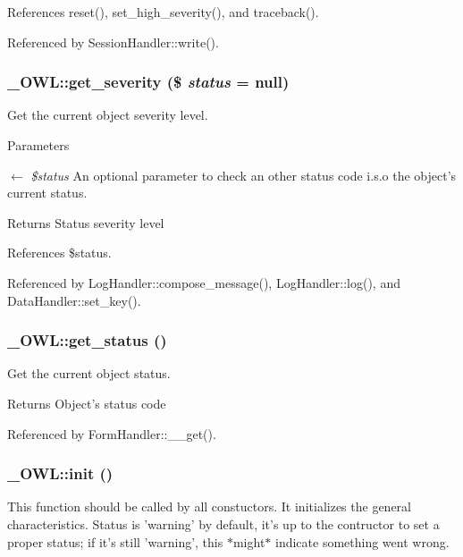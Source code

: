 References reset(), set\_\-high\_\-severity(), and traceback().



Referenced by SessionHandler::write().

\subsubsection[{get\_\-severity}]{\setlength{\rightskip}{0pt plus 5cm}\_\-OWL::get\_\-severity (\$ {\em status} = {\ttfamily null})}\label{class__OWL_adf9509ef96858be7bdd9414c5ef129aa}
Get the current object severity level.


\begin{DoxyParams}{Parameters}
\item[\mbox{$\leftarrow$} {\em \$status}]An optional parameter to check an other status code i.s.o the object's current status. \end{DoxyParams}
\begin{DoxyReturn}{Returns}
Status severity level 
\end{DoxyReturn}


References \$status.



Referenced by LogHandler::compose\_\-message(), LogHandler::log(), and DataHandler::set\_\-key().

\subsubsection[{get\_\-status}]{\setlength{\rightskip}{0pt plus 5cm}\_\-OWL::get\_\-status ()}\label{class__OWL_a99ec771fa2c5c279f80152cc09e489a8}
Get the current object status.

\begin{DoxyReturn}{Returns}
Object's status code 
\end{DoxyReturn}


Referenced by FormHandler::\_\-\_\-get().

\subsubsection[{init}]{\setlength{\rightskip}{0pt plus 5cm}\_\-OWL::init ()}\label{class__OWL_ae0ef3ded56e8a6b34b6461e5a721cd3e}
This function should be called by all constuctors. It initializes the general characteristics. Status is 'warning' by default, it's up to the contructor to set a proper status; if it's still 'warning', this $\ast$might$\ast$ indicate something went wrong. 

